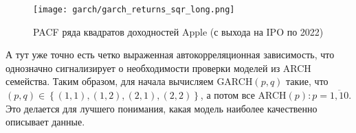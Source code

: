 \begin{figure}[H]
	\centering
	\texttt{[image: garch/garch\_returns\_sqr\_long.png]}
	\caption{PACF ряда квадратов доходностей Apple (с выхода на IPO по 2022)}
\end{figure}
\noindent А тут уже точно есть четко выраженная автокорреляционная зависимость, что однозначно сигнализирует о необходимости проверки моделей из ARCH семейства. Таким образом, для начала вычисляем GARCH$(p, q)$ такие, что $(p, q) \in \left\{(1, 1), (1, 2), (2, 1), (2, 2)\right\}$, а потом все ARCH$(p): p = \overline{1,10}$. Это делается для лучшего понимания, какая модель наиболее качественно описывает данные.





\begin{landscape}
	
\end{landscape}

